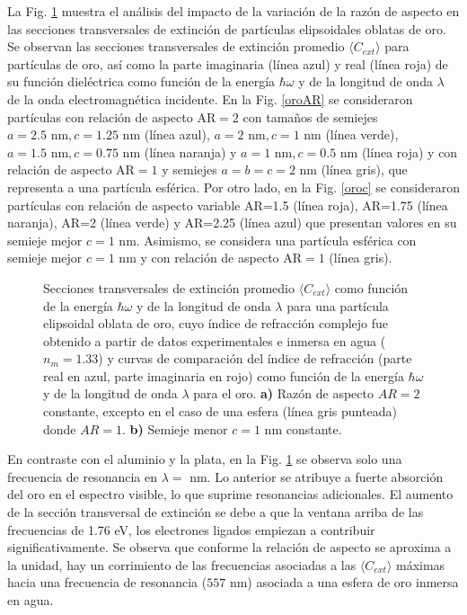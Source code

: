 La Fig. \ref{oro} muestra el análisis del impacto de la variación de la razón de aspecto en las secciones transversales de extinción de partículas elipsoidales oblatas de oro. Se observan las secciones transversales de extinción promedio  $\langle C_{ext}\rangle$ para partículas de oro, así como la parte imaginaria (línea azul) y real (línea roja) de su función dieléctrica como función de la energía $\hbar\omega$ y de la longitud de onda $\lambda$ de la onda electromagnética incidente. En la Fig. \ref{oroAR} se consideraron partículas con relación de aspecto AR$=2$ con tamaños de semiejes $a=2.5 \text{ nm}, c=1.25 \text{ nm}$ (línea azul), $a=2 \text{ nm}, c=1 \text{ nm}$ (línea verde), $a=1.5 \text{ nm}, c=0.75 \text{ nm}$ (línea naranja) y $a=1 \text{ nm}, c=0.5 \text{ nm}$ (línea roja) y con relación de aspecto AR$=1$ y semiejes $a=b=c=2$ nm (línea gris), que representa a una partícula esférica. Por otro lado, en la Fig. \ref{oroc} se consideraron partículas con relación de aspecto variable AR=1.5 (línea roja), AR=1.75 (línea naranja), AR=2 (línea verde) y AR=2.25 (línea azul) que presentan valores en su semieje mejor $c=1\text{ nm}$. Asimismo, se considera una partícula esférica con semieje mejor $c=1\text{ nm}$ y con relación de aspecto AR$=1$ (línea gris).
\begin{figure}[H]
	\quad%
	\caption{Secciones transversales de extinción promedio $\langle C_{ext}\rangle$ como función de la energía $\hbar\omega$ y de la longitud de onda $\lambda$ para una partícula elipsoidal oblata de oro, cuyo índice de refracción complejo fue obtenido a partir de datos experimentales  e inmersa en agua ($n_m=1.33$) y curvas de comparación del índice de refracción (parte real en azul, parte imaginaria en rojo) como función de la energía $\hbar\omega$ y de la longitud de onda $\lambda$ para el oro. \textbf{a)} Razón de aspecto $AR=2$ constante, excepto en el caso de una esfera (línea gris punteada) donde $AR=1$. \textbf{b)} Semieje menor $c=1$ nm constante.}\label{oro}
\end{figure}

En contraste con el aluminio y la plata, en la Fig. \ref{oro} se observa solo una frecuencia de resonancia en $\lambda=$ nm. Lo anterior se atribuye a fuerte absorción del oro en el espectro visible, lo que suprime resonancias adicionales. El aumento de la sección transversal de extinción se debe a que la ventana arriba de las frecuencias de 1.76 eV, los electrones ligados empiezan a contribuir significativamente. Se observa que conforme la relación de aspecto se aproxima a la unidad, hay un corrimiento de las frecuencias asociadas a las $\langle C_{ext}\rangle$ máximas hacia una frecuencia de resonancia ($557\text{ nm}$) asociada a una esfera de oro inmersa en agua. 



